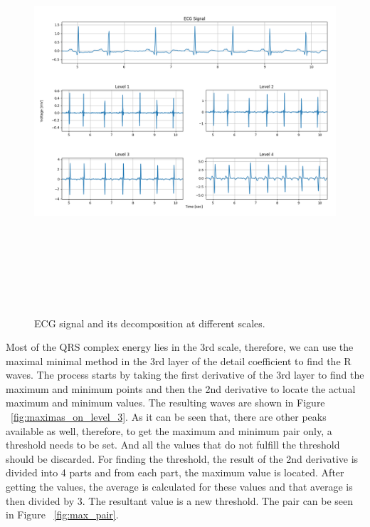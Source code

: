 \begin{figure}[htpb]
	\centering
	\includegraphics[width=15cm,height=15cm,keepaspectratio=true]{images/detail_coefficients}
	\caption{
		ECG signal and its decomposition at different scales.
	}
	\label{fig:detail_coefficients}
\end{figure}

Most of the QRS complex energy lies in the 3rd scale, therefore, we can use the maximal minimal method in the 3rd layer of the detail coefficient to find the R waves.  The process starts by taking the first derivative of the 3rd layer to find the maximum and minimum points and then the 2nd derivative to locate the actual maximum and minimum values. The resulting waves are shown in Figure ~\ref{fig:maximas_on_level_3}. As it can be seen that, there are other peaks available as well, therefore, to get the maximum and minimum pair only, a threshold needs to be set. And all the values that do not fulfill the threshold should be discarded. 
For finding the threshold, the result of the 2nd derivative is divided into 4 parts and from each part, the maximum value is located. After getting the values, the average is calculated for these values and that average is then divided by 3. The resultant value is a new threshold. The pair can be seen in Figure ~\ref{fig:max_pair}.

